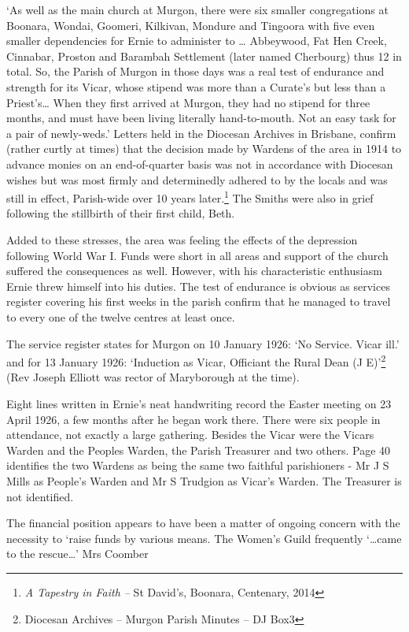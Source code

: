 `As well as the main church at Murgon, there were six smaller congregations at Boonara, Wondai, Goomeri, Kilkivan, Mondure and Tingoora with five even smaller dependencies for Ernie to administer to \ldots{} Abbeywood, Fat Hen Creek, Cinnabar, Proston and Barambah Settlement (later named Cherbourg) thus 12 in total. So, the Parish of Murgon in those days was a real test of endurance and strength for its Vicar, whose stipend was more than a Curate's but less than a Priest's\ldots{} When they first arrived at Murgon, they had no stipend for three months, and must have been living literally hand-to-mouth. Not an easy task for a pair of newly-weds.' Letters held in the Diocesan Archives in Brisbane, confirm (rather curtly at times) that the decision made by Wardens of the area in 1914 to advance monies on an end-of-quarter basis was not in accordance with Diocesan wishes but was most firmly and determinedly adhered to by the locals and was still in effect, Parish-wide over 10 years later.\footnote{\emph{A Tapestry in Faith --} St David's, Boonara, Centenary, 2014} The Smiths were also in grief following the stillbirth of their first child, Beth.

Added to these stresses, the area was feeling the effects of the depression following World War I. Funds were short in all areas and support of the church suffered the consequences as well. However, with his characteristic enthusiasm Ernie threw himself into his duties. The test of endurance is obvious as services register covering his first weeks in the parish confirm that he managed to travel to every one of the twelve centres at least once.

The service register states for Murgon on 10 January 1926: `No Service. Vicar ill.' and for 13 January 1926: `Induction as Vicar, Officiant the Rural Dean (J E)'\footnote{Diocesan Archives -- Murgon Parish Minutes -- DJ Box3} (Rev Joseph Elliott was rector of Maryborough at the time).

Eight lines written in Ernie's neat handwriting record the Easter meeting on 23 April 1926, a few months after he began work there. There were six people in attendance, not exactly a large gathering. Besides the Vicar were the Vicars Warden and the Peoples Warden, the Parish Treasurer and two others. Page 40 identifies the two Wardens as being the same two faithful parishioners - Mr J S Mills as People's Warden and Mr S Trudgion as Vicar's Warden. The Treasurer is not identified.

The financial position appears to have been a matter of ongoing concern with the necessity to `raise funds by various means. The Women's Guild frequently `\ldots came to the rescue\ldots' Mrs Coomber


